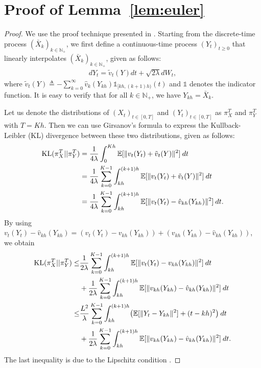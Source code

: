 \section{Proof of Lemma~\ref{lem:euler}}
%
%
\begin{proof}
We use the proof technique presented in \cite{dalalyan2017theoretical,raginsky17a}. Starting from the discrete-time process $(\bar{X}_k)_{k\in \mathbb{N}_+}$, we first define a continuous-time process $(Y_t)_{t\geq 0}$ that linearly interpolates $(\bar{X}_k)_{k\in \mathbb{N}_+}$, given as follows: 
\begin{align}
d Y_t = \tilde{v}_t(Y) dt + \sqrt{2 \lambda} dW_t, \label{eqn:sde_linear}
\end{align}
where $\tilde{v}_t(Y) \triangleq - \sum_{k=0}^{\infty} \hat{v}_k (Y_{kh}) \mathds{1}_{[kh, (k+1)h)}(t)$ and $\mathds{1}$ denotes the indicator function. It is easy to verify that for all $k \in \mathbb{N}_+$, we have $Y_{kh} = \bar{X}_k$. 

Let us denote the distributions of $(X_t)_{t \in [0,T]}$ and $(Y_t)_{t \in [0,T]}$ as $\pi_{X}^T$ and $\pi_{Y}^T$ with $T = Kh$. Then we can use Girsanov's formula to express the Kullback-Leibler (KL) divergence between these two distributions, given as follows:
\begin{align}
\textnormal{KL} (\pi_{X}^T || \pi_{Y}^T) &= \frac1{4 \lambda} \int_0^{Kh} \mathbb{E}[ \|v_t(Y_t) + \tilde{v}_t(Y) \|^2 ]  \> dt \\
&= \frac1{4 \lambda} \sum_{k=0}^{K-1} \int_{kh}^{(k+1)h} \mathbb{E}[ \|v_t(Y_t) + \tilde{v}_t(Y) \|^2 ] \> dt \\
&= \frac1{4 \lambda} \sum_{k=0}^{K-1} \int_{kh}^{(k+1)h} \mathbb{E}[ \|v_t(Y_t) - \hat{v}_{kh}(Y_{kh}) \|^2 ] \> dt.
\end{align}
By using $v_t(Y_t) - \hat{v}_{kh}(Y_{kh}) = ( v_t(Y_t) - v_{kh}(Y_{kh})) + ( v_{kh}(Y_{kh}) - \hat{v}_{kh}(Y_{kh}))$, we obtain
%
\begin{align}
\nonumber \textnormal{KL} (\pi_{X}^T || \pi_{Y}^T) \leq& \frac1{2 \lambda} \sum_{k=0}^{K-1} \int_{kh}^{(k+1)h} \mathbb{E}[ \|v_t(Y_t) - {v}_{kh}(Y_{kh}) \|^2 ] \> dt \\
&+  \frac1{2 \lambda} \sum_{k=0}^{K-1} \int_{kh}^{(k+1)h} \mathbb{E}[ \|v_{kh}(Y_{kh}) - \hat{v}_{kh}(Y_{kh}) \|^2 ] \> dt \\
\nonumber \leq& \frac{L^2}{\lambda} \sum_{k=0}^{K-1} \int_{kh}^{(k+1)h} \bigl(\mathbb{E}[ \|Y_t - Y_{kh} \|^2 ] + (t-kh)^2 \bigr)  \> dt \\
&+  \frac1{2 \lambda} \sum_{k=0}^{K-1} \int_{kh}^{(k+1)h} \mathbb{E}[ \|v_{kh}(Y_{kh}) - \hat{v}_{kh}(Y_{kh}) \|^2 ] \> dt . \label{eqn:lem1_proof_interm}
\end{align}
The last inequality is due to the Lipschitz condition .


\end{proof}
